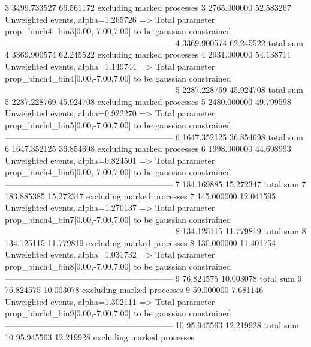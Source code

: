 3          3499.733527     66.561172       excluding marked processes    
3          2765.000000     52.583267       Unweighted events, alpha=1.265726
  => Total parameter prop_binch4_bin3[0.00,-7.00,7.00] to be gaussian constrained
------------------------------------------------------------
4          3369.900574     62.245522       total sum                     
4          3369.900574     62.245522       excluding marked processes    
4          2931.000000     54.138711       Unweighted events, alpha=1.149744
  => Total parameter prop_binch4_bin4[0.00,-7.00,7.00] to be gaussian constrained
------------------------------------------------------------
5          2287.228769     45.924708       total sum                     
5          2287.228769     45.924708       excluding marked processes    
5          2480.000000     49.799598       Unweighted events, alpha=0.922270
  => Total parameter prop_binch4_bin5[0.00,-7.00,7.00] to be gaussian constrained
------------------------------------------------------------
6          1647.352125     36.854698       total sum                     
6          1647.352125     36.854698       excluding marked processes    
6          1998.000000     44.698993       Unweighted events, alpha=0.824501
  => Total parameter prop_binch4_bin6[0.00,-7.00,7.00] to be gaussian constrained
------------------------------------------------------------
7          184.169885      15.272347       total sum                     
7          183.885385      15.272347       excluding marked processes    
7          145.000000      12.041595       Unweighted events, alpha=1.270137
  => Total parameter prop_binch4_bin7[0.00,-7.00,7.00] to be gaussian constrained
------------------------------------------------------------
8          134.125115      11.779819       total sum                     
8          134.125115      11.779819       excluding marked processes    
8          130.000000      11.401754       Unweighted events, alpha=1.031732
  => Total parameter prop_binch4_bin8[0.00,-7.00,7.00] to be gaussian constrained
------------------------------------------------------------
9          76.824575       10.003078       total sum                     
9          76.824575       10.003078       excluding marked processes    
9          59.000000       7.681146        Unweighted events, alpha=1.302111
  => Total parameter prop_binch4_bin9[0.00,-7.00,7.00] to be gaussian constrained
------------------------------------------------------------
10         95.945563       12.219928       total sum                     
10         95.945563       12.219928       excluding marked processes    
